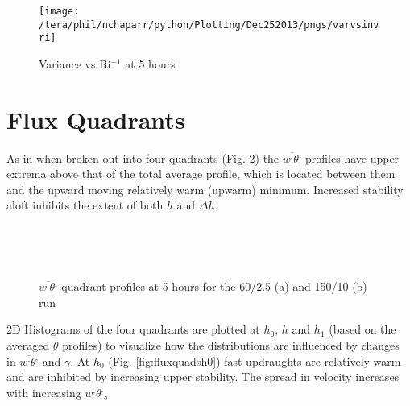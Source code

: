 \begin{figure}[htbp]
    \centering
    \texttt{[image: /tera/phil/nchaparr/python/Plotting/Dec252013/pngs/varvsinvri]}
    \caption{Variance vs \acs{Ri}$^{-1}$ at 5 hours}
    \label{fig:varsvsinvri}   %
\end{figure}

\clearpage

\section{Flux Quadrants}
\label{sec:fluxquadrants}     
\FloatBarrier

As in \cite{SullMoengStev} when broken out into four quadrants (Fig. \ref{fig:fluxqadprofs}) the $\overline{w^{,}\theta^{,}}$ profiles have upper extrema above that of the
total average profile, which is located between them and the upward moving relatively warm (upwarm) minimum.  Increased stability aloft inhibits the extent of both 
$h$ and $\Delta h$.\\  

\begin{figure}[htbp]
\begin{minipage}[b]{0.5\linewidth}
        \\
        \end{minipage}             
\quad
\begin{minipage}[b]{0.5\linewidth}
        \\
       \end{minipage}
        \caption{$\overline{w^{,} \theta^{,}}$ quadrant profiles at 5 hours for the 60/2.5 (a) and 150/10 (b) run}
        \label{fig:fluxqadprofs}
\end{figure}

2D Histograms of the four quadrants are plotted at $h_{0}$, $h$ and $h_{1}$ (based on the averaged $\theta$ profiles)
to visualize how the distributions are influenced by changes in $\overline{w^{,} \theta^{,}}$ and $\gamma$.  At $h_{0}$
(Fig. \ref{fig:fluxquadsh0}) fast updraughts are relatively warm and are inhibited by increasing upper stability.  The spread
in velocity increases with increasing $\overline{w^{,}\theta^{,}}_{s}$\\

